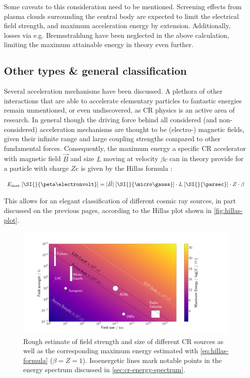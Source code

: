 Some caveats to this consideration need to be mentioned. Screening effects from plasma clouds surrounding the central body are expected to limit the electrical 
field strength, and maximum acceleration energy by extension. Additionally, losses via e.g. Bremsstrahlung have been neglected in the above calculation, limiting
the maximum attainable energy in theory even further. 

\subsection{Other types \& general classification}
\label{ssec:cr-hillas-plot}

Several acceleration mechanisms have been discussed. A plethora of other interactions that are able to accelerate elementary particles to fantastic energies remain
unmentioned, or even undiscovered, as CR physics is an active area of research. In general though the driving force behind all considered (and non-considered)
acceleration mechanisms are thought to be (electro-) magnetic fields, given their infinite range and large coupling strengths compared to other fundamental 
forces. Consequently, the maximum energy a specific CR accelerator with magnetic field $\vec{B}$ and size $L$ moving at velocity $\beta c$ can in theory provide 
for a particle with charge $Ze$ is given by the Hillas formula \cite{hillas1984origin}:

\begin{equation}
\label{eq:hillas-formula}
E_\text{max}\;[\SI{}{\peta\electronvolt}] = |\vec{B}|\;[\SI{}{\micro\gauss}] \cdot L\;[\SI{}{\parsec}] \cdot Z \cdot \beta
\end{equation}

This allows for an elegant classification of different cosmic ray sources, in part discussed on the previous pages, according to the Hillas plot shown in 
\autoref{fig:hillas-plot}.

\begin{figure}
	\centering
	\includegraphics[width=1\textwidth]{./plots/hillas_plot.png}
	\caption{Rough estimate of field strength and size of different CR sources as well as the corresponding maximum energy estimated with 
    \autoref{eq:hillas-formula} ($\beta = Z = 1$). Isoenergetic lines mark notable points in the energy spectrum discussed in 
    \autoref{sec:cr-energy-spectrum}.}
	\label{fig:hillas-plot}
\end{figure}

